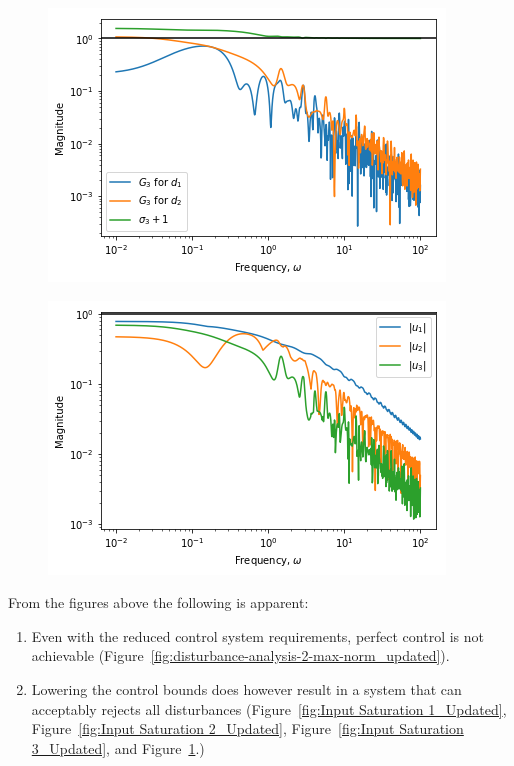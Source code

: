 \begin{figure}[H]
	\centering
	\begin{minipage}{.48\textwidth}
		\centering
		\includegraphics[width=\linewidth]{Figures/InputSaturation3_Updated}
		\label{fig:Input Saturation 3_Updated}
	\end{minipage}%
	\hfill
	\begin{minipage}{.48\textwidth}
		\centering
		\includegraphics[width=\linewidth]{Figures/Input_Requirements_Updated}
		\label{fig:Input Requirements_Updated}
	\end{minipage}
\end{figure}

From the figures above the following is apparent:

\begin{enumerate}
	\item Even with the reduced control system requirements, perfect control is not achievable (Figure~\ref{fig:disturbance-analysis-2-max-norm_updated}).
	\item Lowering the control bounds does however result in a system that can acceptably rejects all disturbances (Figure~\ref{fig:Input Saturation 1_Updated}, Figure~\ref{fig:Input Saturation 2_Updated}, Figure~\ref{fig:Input Saturation 3_Updated}, and Figure~\ref{fig:Input Requirements_Updated}.)
\end{enumerate}